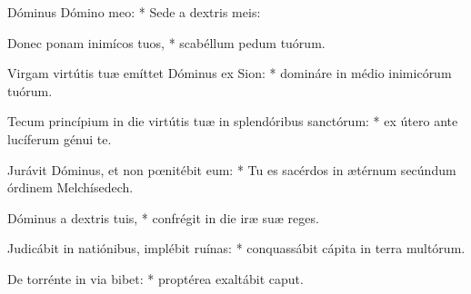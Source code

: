 \begin{psalmus}

 \hspace{.5em} Dóminus \hspace{.5em} Dómino meo: \hspace{.5em} * \hspace{.5em} Sede \hspace{.5em} a \hspace{.5em} dextris meis:

Donec ponam inimícos tuos, * scabéllum pedum tuórum.

Virgam virtútis tuæ emíttet Dóminus ex Sion: * domináre in médio inimicórum tuórum.

Tecum princípium in die virtútis tuæ in splendóribus sanctórum: * ex útero ante lucíferum génui te.

Jurávit Dóminus, et non pœnitébit eum: * Tu es sacérdos in ætérnum secúndum órdinem Melchísedech.

Dóminus a dextris tuis, * confrégit in die iræ suæ reges.

Judicábit in natiónibus, implébit ruínas: * conquassábit cápita in terra multórum.

De torrénte in via bibet: * proptérea exaltábit caput.

\end{psalmus}
